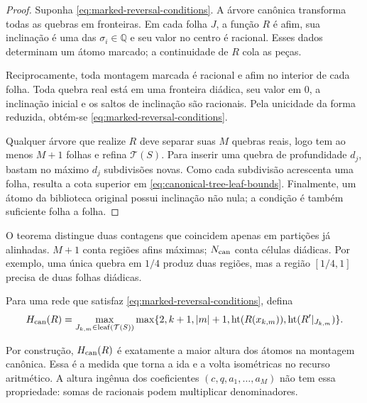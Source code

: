 \begin{proof}
Suponha \eqref{eq:marked-reversal-conditions}. A árvore canônica transforma
todas as quebras em fronteiras. Em cada folha $J$, a função $R$ é afim, sua
inclinação é uma das $\sigma_i\in\mathbb Q$ e seu valor no centro é racional.
Esses dados determinam um átomo marcado; a continuidade de $R$ cola as peças.

Reciprocamente, toda montagem marcada é racional e afim no interior de cada
folha. Toda quebra real está em uma fronteira diádica, seu valor em $0$, a
inclinação inicial e os saltos de inclinação são racionais. Pela unicidade da
forma reduzida, obtém-se \eqref{eq:marked-reversal-conditions}.

Qualquer árvore que realize $R$ deve separar suas $M$ quebras reais, logo tem
ao menos $M+1$ folhas e refina $\mathcal T(S)$. Para inserir uma quebra de
profundidade $d_j$, bastam no máximo $d_j$ subdivisões novas. Como cada
subdivisão acrescenta uma folha, resulta a cota superior em
\eqref{eq:canonical-tree-leaf-bounds}. Finalmente, um átomo da biblioteca
original possui inclinação não nula; a condição é também suficiente folha a
folha.
\end{proof}

O teorema distingue duas contagens que coincidem apenas em partições já
alinhadas. $M+1$ conta regiões afins máximas; $N_{\rm can}$ conta células
diádicas. Por exemplo, uma única quebra em $1/4$ produz duas regiões, mas a
região $[1/4,1]$ precisa de duas folhas diádicas.

\begin{definition}
\label{def:canonical-network-height}
Para uma rede que satisfaz \eqref{eq:marked-reversal-conditions}, defina
\begin{equation}
 H_{\rm can}(R)=
 \max_{J_{k,m}\in\operatorname{leaf}(\mathcal T(S))}
 \max\{2,k+1,|m|+1,\operatorname{ht}(R(x_{k,m})),\operatorname{ht}(R'|_{J_{k,m}})\}.
 \label{eq:canonical-network-height}
\end{equation}
\end{definition}

Por construção, $H_{\rm can}(R)$ é exatamente a maior altura dos átomos na
montagem canônica. Essa é a medida que torna a ida e a volta isométricas no
recurso aritmético. A altura ingênua dos coeficientes
$(c,q,a_1,\ldots,a_M)$ não tem essa propriedade: somas de racionais podem
multiplicar denominadores.

